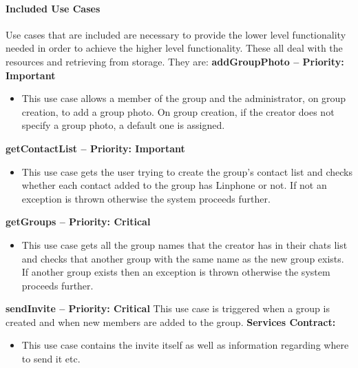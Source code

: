 \documentclass[11pt]{article}
\begin{document}
\paragraph{Included Use Cases} %
 Use cases that are included are necessary to provide the lower level functionality needed in order to achieve the higher level functionality. These all deal with the resources and retrieving from storage. They  are:\newline
 \newline
 \textbf{addGroupPhoto  – Priority: Important} \newline
 \begin{itemize}
 \item	This use case allows a member of the group and the administrator, on group creation, to add a group photo. On group creation, if the creator does not specify a group photo, a default one is assigned.\newline
 \end{itemize}
 \textbf{getContactList – Priority: Important} \newline
 \begin{itemize}
 \item	This use case gets the user trying to create the group’s contact list and checks whether each contact added to the group has Linphone or not. If not an exception is thrown otherwise the system proceeds further.\newline
 \end{itemize}
 \textbf{getGroups  – Priority: Critical} \newline
 \begin{itemize}
\item	This use case gets all the group names that the creator has in their chats list and checks that another group with the same name as the new group exists. If another group exists then an exception is thrown otherwise the system proceeds further. \newline
\end{itemize}
 \textbf{sendInvite – Priority: Critical} \newline
 This use case is triggered when a group is created and when new members are added to the group.  \newline 
\textbf{Services Contract:}
 \begin{itemize}
 \item	This use case contains the invite itself as well as information regarding where to send it etc.\newline
 \end{itemize}
\end{document}
